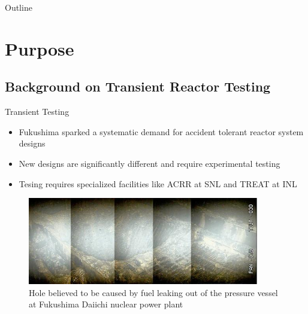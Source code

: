 \documentclass[8pt,xcolor=dvipnames]{beamer}
\begin{document}

\begin{frame}{Outline}
\begin{multicols}{2}
\tableofcontents 
\end{multicols}
\end{frame}

\section{Purpose}

\subsection{Background on Transient Reactor Testing}

\begin{frame}{Transient Testing}

\begin{block}{}
\begin{itemize}
\item Fukushima sparked a systematic demand for accident tolerant reactor system designs
\item New designs are significantly different and require experimental testing 
\item Tesing requires specialized facilities like ACRR at SNL and TREAT at INL
\end{itemize}
\end{block}

\begin{figure}
\includegraphics[height=1.5in]{figures/fukushima_melt.jpg}
\caption{Hole believed to be caused by fuel leaking out of the pressure vessel at Fukushima Daiichi nuclear power plant}
\end{figure}

\end{frame}
\end{document}
